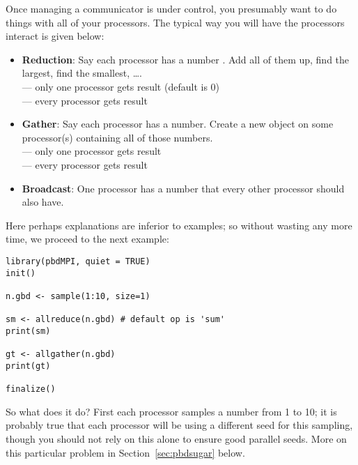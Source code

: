 Once managing a communicator is under control, you presumably want to do
things with all of your processors. The typical way you will have the
processors interact is given below:

\begin{itemize}
  \item \textbf{Reduction}: Say each processor has a number .
        Add all of them up, find the largest, find the smallest, \dots .\\
         ---
        only one processor gets result (default is 0)\\
         ---
        every processor gets result
  \item \textbf{Gather}: Say each processor has a number.
        Create a new object on some processor(s) containing all of
        those numbers.\\
         ---
        only one processor gets result\\
         ---
          every processor gets result
  \item \textbf{Broadcast}: One processor has a number  that
        every other processor should also have.\\
\end{itemize}

Here perhaps explanations are inferior to examples; so without wasting any
more time, we proceed to the next example:

\begin{lstlisting}[language=rr,title=Simple pbdMPI Example 2]
library(pbdMPI, quiet = TRUE)
init()

n.gbd <- sample(1:10, size=1)

sm <- allreduce(n.gbd) # default op is 'sum'
print(sm)

gt <- allgather(n.gbd)
print(gt)

finalize()
\end{lstlisting}

So what does it do? First each processor samples a number from 1 to 10;
it is probably true that each processor will be using a different seed
for this sampling, though you should not rely on this alone to ensure
good parallel seeds. More on this particular problem in
Section~\ref{sec:pbdsugar} below.

